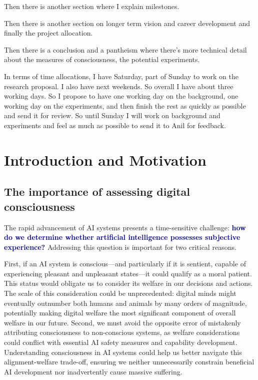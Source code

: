 \documentclass[11pt,a4paper]{article}
\newcommand{\impact}[1]{\textbf{\textcolor{darkblue}{#1}}}
\begin{document}
Then there is another section where I explain milestones.

Then there is another section on longer term vision and career development and finally the project allocation.

Then there is a conclusion and a pantheism where there's more technical detail about the measures of consciousness, the potential experiments.

In terms of time allocations, I have Saturday, part of Sunday to work on the research proposal. I also have next weekends. So overall I have about three working days. So I propose to have one working day on the background, one working day on the experiments, and then finish the rest as quickly as possible and send it for review. So until Sunday I will work on background and experiments and feel as much as possible to send it to Anil for feedback.
\section{Introduction and Motivation}
\label{sec:introduction}

\subsection{The importance of assessing digital consciousness}
The rapid advancement of AI systems presents a time-sensitive challenge: \impact{how do we determine whether artificial intelligence possesses subjective experience?} Addressing this question is important for two critical reasons.

First, if an AI system is conscious—and particularly if it is sentient, capable of experiencing pleasant and unpleasant states—it could qualify as a moral patient. This status would obligate us to consider its welfare in our decisions and actions. The scale of this consideration could be unprecedented: digital minds might eventually outnumber both humans and animals by many orders of magnitude, potentially making digital welfare the most significant component of overall welfare in our future. Second, we must avoid the opposite error of mistakenly attributing consciousness to non-conscious systems, as welfare considerations could conflict with essential AI safety measures and capability development. Understanding consciousness in AI systems could help us better navigate this alignment-welfare trade-off, ensuring we neither unnecessarily constrain beneficial AI development nor inadvertently cause massive suffering.
\end{document}
